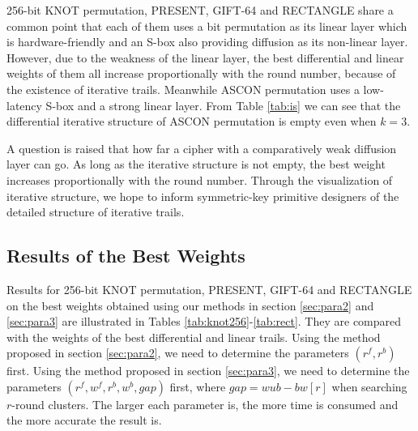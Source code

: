 256-bit KNOT permutation, PRESENT, GIFT-64 and RECTANGLE share a common point that each of them uses a bit permutation as its linear layer which is hardware-friendly and an S-box also providing diffusion as its non-linear layer. However, due to the weakness of the linear layer, the best differential and linear weights of them all increase proportionally with the round number, because of the existence of iterative trails. Meanwhile ASCON permutation uses a low-latency S-box and a strong linear layer. From Table \ref{tab:is} we can see that the differential iterative structure of ASCON permutation is empty even when $k=3$.

A question is raised that how far a cipher with a comparatively weak diffusion layer can go. As long as the iterative structure is not empty, the best weight increases proportionally with the round number. Through the visualization of iterative structure, we hope to inform symmetric-key primitive designers of the detailed structure of iterative trails. 





\subsection{Results of the Best Weights}

Results for 256-bit KNOT permutation, PRESENT, GIFT-64 and RECTANGLE on the best weights obtained using our methods in section \ref{sec:para2} and \ref{sec:para3} are illustrated in Tables \ref{tab:knot256}-\ref{tab:rect}. They are compared with the weights of the best differential and linear trails. Using the method proposed in section \ref{sec:para2}, we need to determine the parameters $(r^f,r^b)$ first. Using the method proposed in section \ref{sec:para3}, we need to determine the parameters $(r^f,w^f,r^b,w^b,gap)$ first, where $gap=wub-bw[r]$ when searching $r$-round clusters. The larger each parameter is, the more time is consumed and the more accurate the result is. 

